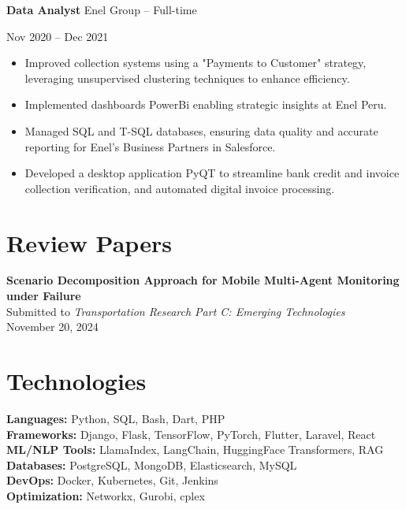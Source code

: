 \documentclass[10pt, letterpaper]{article}
\newenvironment{highlights}{
    \begin{itemize}[
        topsep=0.10 cm,
        parsep=0.10 cm,
        partopsep=0pt,
        itemsep=0pt,
        leftmargin=0 cm + 10pt
    ]
}{
    \end{itemize}
} %
\newenvironment{twocolentry}[2][]{
    \onecolentry
    \def\secondColumn{#2}
    \setcolumnwidth{\fill, 4.5 cm}
    \begin{paracol}{2}
}{
    \switchcolumn \raggedleft \secondColumn
    \end{paracol}
    \endonecolentry
} %
\begin{document}
\begin{twocolentry}{Nov 2020 – Dec 2021}
    \textbf{Data Analyst} \textbar Enel Group – Full-time
\end{twocolentry}
\begin{highlights}
    \item Improved collection systems using a "Payments to Customer" strategy, leveraging unsupervised clustering techniques to enhance efficiency.
    \item Implemented dashboards PowerBi enabling strategic insights at Enel Peru.
    \item Managed SQL and T-SQL databases, ensuring data quality and accurate reporting for Enel's Business Partners in Salesforce.
    \item Developed a desktop application PyQT to streamline bank credit and invoice collection verification, and automated digital invoice processing.
\end{highlights}

\vspace{0.3cm}





\section*{Review Papers}
\textbf{Scenario Decomposition Approach for Mobile Multi-Agent Monitoring under Failure} \\
Submitted to \textit{Transportation Research Part C: Emerging Technologies} \\
November 20, 2024

\section*{Technologies}
\begin{multicols}{2}
    \textbf{Languages:} Python, SQL, Bash, Dart, PHP \\
    \textbf{Frameworks:} Django, Flask, TensorFlow, PyTorch, Flutter, Laravel, React \\
    \textbf{ML/NLP Tools:} LlamaIndex, LangChain, HuggingFace Transformers, RAG \\
    \textbf{Databases:} PostgreSQL, MongoDB, Elasticsearch, MySQL \\
    \textbf{DevOps:} Docker, Kubernetes, Git, Jenkins \\
    \textbf{Optimization:} Networkx, Gurobi, cplex
\end{multicols}

    
\end{document}
